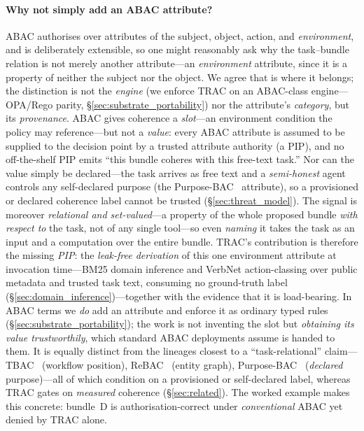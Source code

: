 \documentclass[sigconf,review,anonymous]{acmart}
\begin{document}
\paragraph{Why not simply add an ABAC attribute?}\label{sec:why_not_abac} ABAC authorises over attributes of the subject, object, action, and \emph{environment}, and is deliberately extensible, so one might reasonably ask why the task--bundle relation is not merely another attribute---an \emph{environment} attribute, since it is a property of neither the subject nor the object. We agree that is where it belongs; the distinction is not the \emph{engine} (we enforce TRAC on an ABAC-class engine---OPA/Rego parity, \S\ref{sec:substrate_portability}) nor the attribute's \emph{category}, but its \emph{provenance}. ABAC gives coherence a \emph{slot}---an environment condition the policy may reference---but not a \emph{value}: every ABAC attribute is assumed to be supplied to the decision point by a trusted attribute authority (a PIP), and no off-the-shelf PIP emits ``this bundle coheres with this free-text task.'' Nor can the value simply be declared---the task arrives as free text and a \emph{semi-honest} agent controls any self-declared purpose (the Purpose-BAC~\cite{byun2005purpose} attribute), so a provisioned or declared coherence label cannot be trusted (\S\ref{sec:threat_model}). The signal is moreover \emph{relational and set-valued}---a property of the whole proposed bundle \emph{with respect to} the task, not of any single tool---so even \emph{naming} it takes the task as an input and a computation over the entire bundle. TRAC's contribution is therefore the missing \emph{PIP}: the \emph{leak-free derivation} of this one environment attribute at invocation time---BM25 domain inference and VerbNet action-classing over public metadata and trusted task text, consuming no ground-truth label (\S\ref{sec:domain_inference})---together with the evidence that it is load-bearing. In ABAC terms we \emph{do} add an attribute and enforce it as ordinary typed rules (\S\ref{sec:substrate_portability}); the work is not inventing the slot but \emph{obtaining its value trustworthily}, which standard ABAC deployments assume is handed to them. It is equally distinct from the lineages closest to a ``task-relational'' claim---TBAC~\cite{thomas1997tbac} (workflow position), ReBAC~\cite{fong2011rebac} (entity graph), Purpose-BAC~\cite{byun2005purpose} (\emph{declared} purpose)---all of which condition on a provisioned or self-declared label, whereas TRAC gates on \emph{measured} coherence (\S\ref{sec:related}). The worked example makes this concrete: bundle~D is authorisation-correct under \emph{conventional} ABAC yet denied by TRAC alone.
\end{document}
